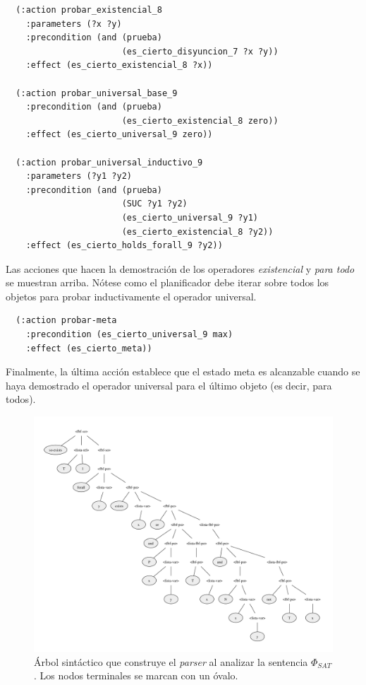 \begin{verbatim}
  (:action probar_existencial_8
    :parameters (?x ?y)
    :precondition (and (prueba)
                       (es_cierto_disyuncion_7 ?x ?y))
    :effect (es_cierto_existencial_8 ?x))

  (:action probar_universal_base_9
    :precondition (and (prueba)
                       (es_cierto_existencial_8 zero))
    :effect (es_cierto_universal_9 zero))

  (:action probar_universal_inductivo_9
    :parameters (?y1 ?y2)
    :precondition (and (prueba)
                       (SUC ?y1 ?y2)
                       (es_cierto_universal_9 ?y1)
                       (es_cierto_existencial_8 ?y2))
    :effect (es_cierto_holds_forall_9 ?y2))
\end{verbatim}

Las acciones que hacen la demostración de los operadores \textit{existencial} y 
\textit{para todo} se muestran arriba. Nótese como el planificador debe iterar
sobre todos los objetos para probar inductivamente el operador universal.

\begin{verbatim}
  (:action probar-meta
    :precondition (es_cierto_universal_9 max)
    :effect (es_cierto_meta))
\end{verbatim}

Finalmente, la última acción establece que el estado meta es alcanzable cuando
se haya demostrado el operador universal para el último objeto (es decir, para
todos).

\begin{landscape}
\begin{figure}[h!]
\centering
\includegraphics[height=\textheight]{figuras/arbolsintaxis.pdf}
\caption[Arbol sintáctico de $\Phi_{SAT}$]{Árbol sintáctico que construye el \textit{parser} al analizar la
sentencia $\Phi_{SAT}$. Los nodos terminales se marcan con un óvalo.}
\label{arbolsintactico}
\end{figure}
\end{landscape}

